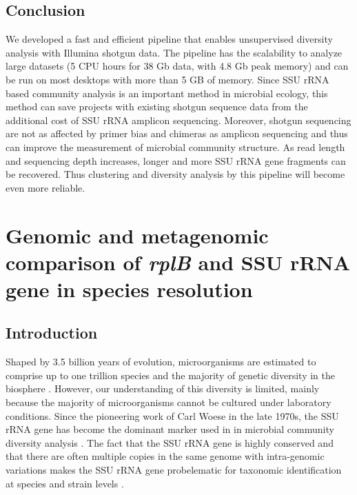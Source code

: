 \documentclass[]{msu-thesis}
\begin{document}
\section{Conclusion}

We developed a fast and efficient pipeline that enables unsupervised diversity analysis with Illumina shotgun data. The pipeline has the scalability to analyze large datasets (5 CPU hours for 38 Gb data, with 4.8 Gb peak memory) and can be run on most desktops with more than 5 GB of memory. Since SSU rRNA based community analysis is an important method in microbial ecology, this method can save projects with existing shotgun sequence data from the additional cost of SSU rRNA amplicon sequencing. Moreover, shotgun sequencing are not as affected by primer bias and chimeras as amplicon sequencing and thus can improve the measurement of microbial community structure. As read length and sequencing depth increases, longer and more SSU rRNA gene fragments can be recovered. Thus clustering and diversity analysis by this pipeline will become even more reliable.


\chapter{Genomic and metagenomic comparison of \textit{\texorpdfstring{\MakeLowercase{rpl}B}{rplB}} and SSU \texorpdfstring{\MakeLowercase{r}RNA}{rRNA} gene in species resolution}

\section{Introduction}

Shaped by 3.5 billion years of evolution, microorganisms are estimated to comprise up to one trillion species and the majority of genetic diversity in the biosphere \cite{locey_scaling_2016}. However, our understanding of this diversity is limited, mainly because the majority of microorganisms cannot be cultured under laboratory conditions. Since the pioneering work of Carl Woese in the late 1970s, the SSU rRNA gene has become the dominant marker used in in microbial community diversity analysis \cite{woese_phylogenetic_1977,lane_rapid_1985,huse_exploring_2008,caporaso_ultra-high-throughput_2012}. The fact that the SSU rRNA gene is highly conserved and that there are often multiple copies in the same genome with intra-genomic variations makes the SSU rRNA gene probelematic for taxonomic  identification at species and strain levels \cite{case_use_2007,roux_comparison_2011,wu_simple_2008}.
\end{document}

